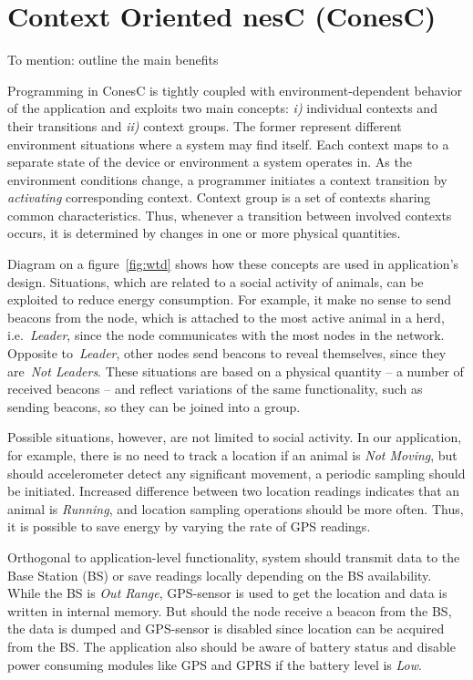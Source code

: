\section{Context Oriented nesC (ConesC)} 

To mention: outline the main benefits

Programming in ConesC is tightly coupled with environment-dependent behavior of
the application and exploits two main concepts: \emph{i)} individual contexts
and their transitions and \emph{ii)} context groups. The former represent
different environment situations where a system may find itself. Each context
maps to a separate state of the device or environment a system operates in. As
the environment conditions change, a programmer initiates a context transition
by \emph{activating} corresponding context. Context group is a set of contexts
sharing common characteristics. Thus, whenever a transition between involved
contexts occurs, it is determined by changes in one or more physical quantities.

Diagram on a figure~\ref{fig:wtd} shows how these concepts are used in application's design.
Situations, which are related to a social activity of animals, can be exploited
to reduce energy consumption. For example, it make no sense to send beacons
from the node, which is attached to the most active animal in a herd, i.e.~\emph{Leader},
since the node communicates with the most nodes in the network. Opposite to~\emph{Leader},
other nodes send beacons to reveal themselves, since they are~\emph{Not Leaders}.
These situations are based on a physical quantity -- a number of
received beacons -- and reflect variations of the same functionality,
such as sending beacons, so they can be joined into a group.

Possible situations, however, are not limited to social activity. In our
application, for example, there is no need to
track a location if an animal is \emph{Not Moving}, but should accelerometer detect any
significant movement, a periodic sampling should be initiated. Increased
difference between two location readings indicates that an animal is
\emph{Running}, and location sampling operations should be more often. Thus, it
is possible to save energy by varying the rate of GPS readings.

Orthogonal to application-level functionality, system should transmit data to
the Base Station (BS) or save readings locally depending on the BS
availability. While the BS is \emph{Out Range}, GPS-sensor is used to
get the location and data is written in internal memory. But should the node
receive a beacon from the BS, the data is dumped and GPS-sensor is disabled
since location can be acquired from the BS. The application also should be aware
of battery status and disable power consuming modules like GPS and GPRS if the
battery level is \emph{Low}.

